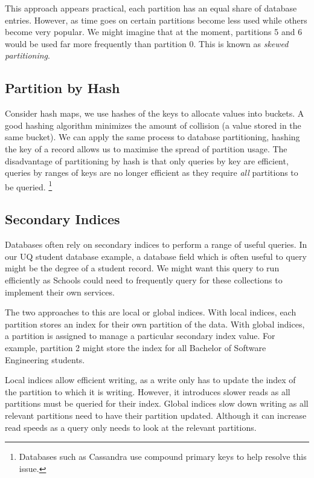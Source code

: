 This approach appears practical,
each partition has an equal share of database entries.
However, as time goes on certain partitions become less used while others become very popular.
We might imagine that at the moment,
partitions 5 and 6 would be used far more frequently than partition 0.
This is known as \textsl{skewed partitioning}.

\subsection*{Partition by Hash}

Consider hash maps,
we use hashes of the keys to allocate values into buckets.
A good hashing algorithm minimizes the amount of collision (a value stored in the same bucket).
We can apply the same process to database partitioning,
hashing the key of a record allows us to maximise the spread of partition usage.
The disadvantage of partitioning by hash is that only queries by key are efficient,
queries by ranges of keys are no longer efficient as they require \emph{all} partitions to be queried.%
\footnote{Databases such as Cassandra use compound primary keys to help resolve this issue.}

\subsection*{Secondary Indices}

Databases often rely on secondary indices to perform a range of useful queries.
In our UQ student database example,
a database field which is often useful to query might be the degree of a student record.
We might want this query to run efficiently as Schools could need to frequently query for these collections to implement their own services.

The two approaches to this are local or global indices.
With local indices, each partition stores an index for their own partition of the data.
With global indices, a partition is assigned to manage a particular secondary index value.
For example, partition 2 might store the index for all Bachelor of Software Engineering students.

Local indices allow efficient writing,
as a write only has to update the index of the partition to which it is writing.
However, it introduces slower reads as all partitions must be queried for their index.
Global indices slow down writing as all relevant partitions need to have their partition updated.
Although it can increase read speeds as a query only needs to look at the relevant partitions.

